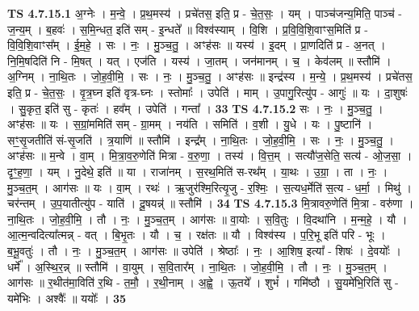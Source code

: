 \documentclass[17pt]{extarticle}
\begin{document}
                                \textbf{ TS 4.7.15.1} \newline
                  अ॒ग्नेः । म॒न्वे॒ । प्र॒थ॒मस्य॑ । प्रचे॑तस॒ इति॒ प्र - चे॒त॒सः॒ । यम् । पाञ्च॑जन्य॒मिति॒ पाञ्च॑ - ज॒न्य॒म् । ब॒हवः॑ । स॒मि॒न्धत॒ इति॑ सम् - इ॒न्धते᳚ ॥ विश्व॑स्याम् । वि॒शि । प्र॒वि॒वि॒शि॒वाꣳस॒मिति॑ प्र - वि॒वि॒शि॒वाꣳस᳚म् । ई॒म॒हे॒ । सः । नः॒ । मु॒ञ्च॒तु॒ । अꣳह॑सः ॥ यस्य॑ । इ॒दम् । प्रा॒णदिति॑ प्र - अ॒नत् । नि॒मि॒षदिति॑ नि - मि॒षत् । यत् । एज॑ति । यस्य॑ । जा॒तम् । जन॑मानम् । च॒ । केव॑लम् ॥ स्तौमि॑ । अ॒ग्निम् । ना॒थि॒तः । जो॒ह॒वी॒मि॒ । सः । नः॒ । मु॒ञ्च॒तु॒ । अꣳह॑सः ॥ इन्द्र॑स्य । म॒न्ये॒ । प्र॒थ॒मस्य॑ । प्रचे॑तस॒ इति॒ प्र - चे॒त॒सः॒ । वृ॒त्र॒घ्न इति॑ वृत्र-घ्नः । स्तोमाः᳚ । उपेति॑ । माम् । उ॒पागु॒रित्यु॑प - आगुः॑ ॥ यः । दा॒शुषः॑ । सु॒कृत॒ इति॑ सु - कृतः॑ । हव᳚म् । उपेति॑ । गन्ता᳚ । \textbf{  33} \newline
                  \newline
                                \textbf{ TS 4.7.15.2} \newline
                  सः । नः॒ । मु॒ञ्च॒तु॒ । अꣳह॑सः ॥ यः । स॒ग्रां॒ममिति॑ सम् - ग्रा॒मम् । नय॑ति । समिति॑ । व॒शी । यु॒धे । यः । पु॒ष्टानि॑ । सꣳ॒॒सृ॒जतीति॑ सं-सृ॒जति॑ । त्र॒याणि॑ ॥ स्तौमि॑ । इन्द्र᳚म् । ना॒थि॒तः । जो॒ह॒वी॒मि॒ । सः । नः॒ । मु॒ञ्च॒तु॒ । अꣳह॑सः ॥ म॒न्वे । वा॒म् । मि॒त्रा॒व॒रु॒णेति॑ मित्रा - व॒रु॒णा॒ । तस्य॑ । वि॒त्त॒म् । सत्यौ॑ज॒सेति॒ सत्य॑ - ओ॒ज॒सा॒ । दृꣳ॒॒ह॒णा॒ । यम् । नु॒देथे॒ इति॑ ॥ या । राजा॑नम् । स॒रथ॒मिति॑ स-रथ᳚म् । या॒थः । उ॒ग्रा॒ । ता । नः॒ । मु॒ञ्च॒त॒म् । आग॑सः ॥ यः । वा॒म् । रथः॑ । ऋ॒जुर॑श्मि॒रित्यृ॒जु - र॒श्मिः॒ । स॒त्यध॒र्मेति॑ स॒त्य - ध॒र्मा॒ । मिथु॑ । चर॑न्तम् । उ॒प॒यातीत्यु॑प - याति॑ । दू॒षयन्न्॑ ॥ स्तौमि॑ । \textbf{  34} \newline
                  \newline
                                \textbf{ TS 4.7.15.3} \newline
                  मि॒त्रावरु॒णेति॑ मि॒त्रा - वरु॑णा । ना॒थि॒तः । जो॒ह॒वी॒मि॒ । तौ । नः॒ । मु॒ञ्च॒त॒म् । आग॑सः ॥ वा॒योः । स॒वि॒तुः । वि॒दथा॑नि । म॒न्म॒हे॒ । यौ । आ॒त्म॒न्वदित्या᳚त्मन्न् - वत् । बि॒भृ॒तः । यौ । च॒ । रक्ष॑तः ॥ यौ । विश्व॑स्य । प॒रि॒भू इति॑ परि - भूः । ब॒भू॒वतुः॑ । तौ । नः॒ । मु॒ञ्च॒त॒म् । आग॑सः ॥ उपेति॑ । श्रेष्ठाः᳚ । नः॒ । आ॒शिष॒ इत्या᳚ - शिषः॑ । दे॒वयोः᳚ । धर्मे᳚ । अ॒स्थि॒र॒न्न् ॥ स्तौमि॑ । वा॒युम् । स॒वि॒तार᳚म् । ना॒थि॒तः । जो॒ह॒वी॒मि॒ । तौ । नः॒ । मु॒ञ्च॒त॒म् । आग॑सः ॥ र॒थीत॑मा॒विति॑ र॒थि - त॒मौ॒ । र॒थी॒नाम् । अ॒ह्वे॒ । ऊ॒तये᳚ । शुभं᳚ । गमि॑ष्ठौ । सु॒यमे॑भि॒रिति॑ सु - यमे॑भिः । अश्वैः᳚ ॥ ययोः᳚ । \textbf{  35} \newline
\end{document}
